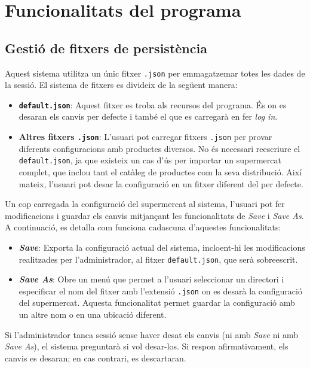 \documentclass[a4paper,12pt]{article}
\begin{document}
	
	\newpage
	\section{Funcionalitats del programa}
	
\subsection{Gestió de fitxers de persistència}

	Aquest sistema utilitza un únic fitxer \texttt{.json} per emmagatzemar totes les dades de la sessió. El sistema de fitxers es divideix de la següent manera:
	
	\begin{itemize}
		\item \textbf{\texttt{default.json}}: Aquest fitxer es troba als recursos del programa. És on es desaran els canvis per defecte i també el que es carregarà en fer \textit{log in}.
		\item \textbf{Altres fitxers \texttt{.json}}: L'usuari pot carregar fitxers \texttt{.json} per provar diferents configuracions amb productes diversos. No és necessari reescriure el \texttt{default.json}, ja que existeix un cas d'ús per importar un supermercat complet, que inclou tant el catàleg de productes com la seva distribució. Així mateix, l'usuari pot desar la configuració en un fitxer diferent del per defecte.
	\end{itemize}
	
	Un cop carregada la configuració del supermercat al sistema, l'usuari pot fer modificacions i guardar els canvis mitjançant les funcionalitats de \textit{Save} i \textit{Save As}. A continuació, es detalla com funciona cadascuna d'aquestes funcionalitats:
	
	\begin{itemize}
		\item \textbf{\textit{Save}}: Exporta la configuració actual del sistema, incloent-hi les modificacions realitzades per l'administrador, al fitxer \texttt{default.json}, que serà sobreescrit.
		\item \textbf{\textit{Save As}}: Obre un menú que permet a l'usuari seleccionar un directori i especificar el nom del fitxer amb l'extensió \texttt{.json} on es desarà la configuració del supermercat. Aquesta funcionalitat permet guardar la configuració amb un altre nom o en una ubicació diferent.
	\end{itemize}
	
	Si l'administrador tanca sessió sense haver desat els canvis (ni amb \textit{Save} ni amb \textit{Save As}), el sistema preguntarà si vol desar-los. Si respon afirmativament, els canvis es desaran; en cas contrari, es descartaran. \\
	
\end{document}
